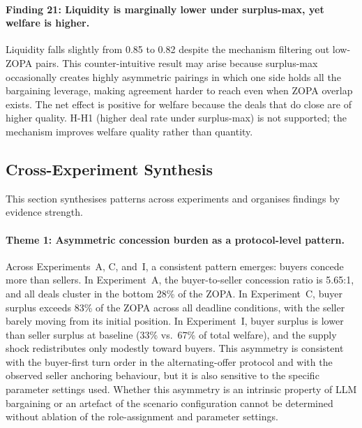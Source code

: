 \paragraph{Finding 21: Liquidity is marginally lower under surplus-max, yet welfare is higher.}
Liquidity falls slightly from 0.85 to 0.82 despite the mechanism filtering out low-ZOPA pairs.  This counter-intuitive result may arise because surplus-max occasionally creates highly asymmetric pairings in which one side holds all the bargaining leverage, making agreement harder to reach even when ZOPA overlap exists.  The net effect is positive for welfare because the deals that do close are of higher quality.  H-H1 (higher deal rate under surplus-max) is not supported; the mechanism improves welfare quality rather than quantity.


\subsection{Cross-Experiment Synthesis}
\label{sec:results-cross}

This section synthesises patterns across experiments and organises findings by evidence strength.

\paragraph{Theme 1: Asymmetric concession burden as a protocol-level pattern.}
Across Experiments~A, C, and~I, a consistent pattern emerges: buyers concede more than sellers.  In Experiment~A, the buyer-to-seller concession ratio is 5.65:1, and all deals cluster in the bottom 28\% of the ZOPA.  In Experiment~C, buyer surplus exceeds 83\% of the ZOPA across all deadline conditions, with the seller barely moving from its initial position.  In Experiment~I, buyer surplus is lower than seller surplus at baseline (33\% vs.\ 67\% of total welfare), and the supply shock redistributes only modestly toward buyers.  This asymmetry is consistent with the buyer-first turn order in the alternating-offer protocol and with the observed seller anchoring behaviour, but it is also sensitive to the specific parameter settings used.  Whether this asymmetry is an intrinsic property of LLM bargaining or an artefact of the scenario configuration cannot be determined without ablation of the role-assignment and parameter settings.

